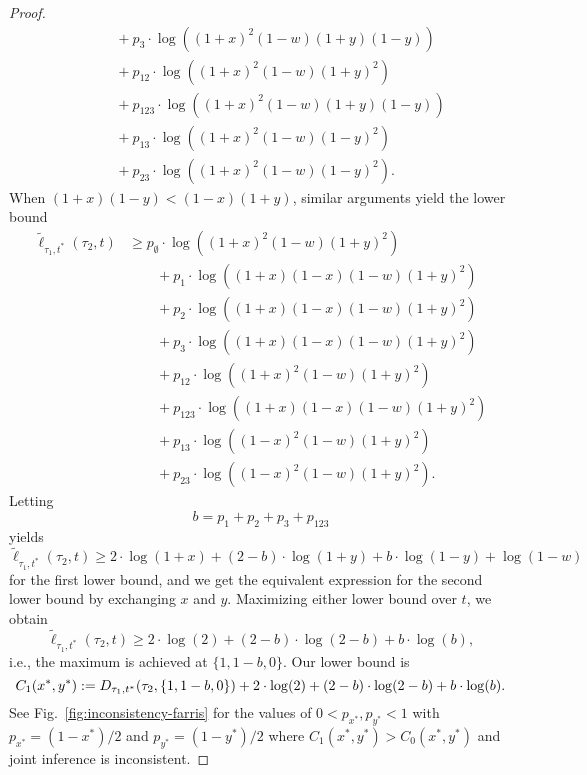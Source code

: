 \begin{proof}
\begin{align*}
    &\qquad + p_{3}          \cdot\log((1+x)^2   (1-w)(1+y)(1-y)) \\
    &\qquad + p_{12}         \cdot\log((1+x)^2   (1-w)(1+y)^2) \\
    &\qquad + p_{123}        \cdot\log((1+x)^2   (1-w)(1+y)(1-y))\\
    &\qquad + p_{13}         \cdot\log((1+x)^2   (1-w)(1-y)^2) \\
    &\qquad + p_{23}         \cdot\log((1+x)^2   (1-w)(1-y)^2).
\end{align*}
When $(1+x)(1-y) < (1-x)(1+y)$, similar arguments yield the lower bound
\begin{align*}
    \tilde{\ell}_{\tau_1,t^*}(\tau_2, t)
    &\ge      p_{\emptyset}  \cdot\log((1+x)^2    (1-w)(1+y)^2) \\
    &\qquad + p_{1}          \cdot\log((1+x)(1-x)(1-w)(1+y)^2) \\
    &\qquad + p_{2}          \cdot\log((1+x)(1-x)(1-w)(1+y)^2) \\
    &\qquad + p_{3}          \cdot\log((1+x)(1-x)(1-w)(1+y)^2) \\
    &\qquad + p_{12}         \cdot\log((1+x)^2    (1-w)(1+y)^2) \\
    &\qquad + p_{123}        \cdot\log((1+x)(1-x)(1-w)(1+y)^2)\\
    &\qquad + p_{13}         \cdot\log((1-x)^2    (1-w)(1+y)^2) \\
    &\qquad + p_{23}         \cdot\log((1-x)^2    (1-w)(1+y)^2).
\end{align*}
Letting
\[
b = p_{1}+p_{2}+p_{3}+p_{123}
\]
yields
\[
    \tilde{\ell}_{\tau_1,t^*}(\tau_2, t)
    \ge      2\cdot\log(1+x)
    + (2-b)  \cdot\log(1+y)
    + b      \cdot\log(1-y)
    + \log(1-w)
\]
for the first lower bound, and we get the equivalent expression for the second lower bound by exchanging $x$ and $y$.
Maximizing either lower bound over $t$, we obtain
\[
\tilde{\ell}_{\tau_1,t^*}(\tau_2, t)
\ge      2\cdot\log(2)
+ (2-b)  \cdot\log(2-b)
+ b      \cdot\log(b),
\]
i.e., the maximum is achieved at $\{1,1-b,0\}$.
Our lower bound is
\[
C_1(x^*, y^*) := D_{\tau_1,t^*}(\tau_2,\{1,1-b,0\}) + 2\cdot\log(2) + (2-b)\cdot\log(2-b) + b\cdot\log(b).
\]
See Fig.~\ref{fig:inconsistency-farris} for the values of $0 < p_{x^*}, p_{y^*} < 1$ with $p_{x^*}=(1-x^*)/2$ and $p_{y^*}=(1-y^*)/2$ where $C_1(x^*, y^*) > C_0(x^*, y^*)$ and joint inference is inconsistent.
\end{proof}

\generalBranchInconsist*

